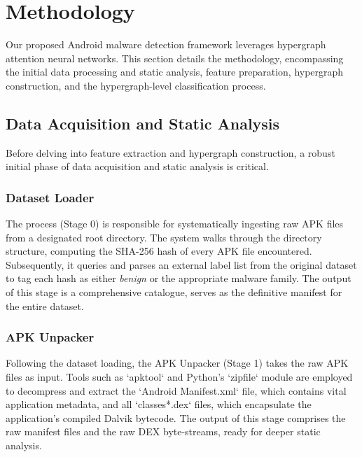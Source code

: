 \documentclass[runningheads]{llncs}
\begin{document}


\section{Methodology}
Our proposed Android malware detection framework leverages hypergraph attention neural networks. This section details the methodology, encompassing the initial data processing and static analysis, feature preparation, hypergraph construction, and the hypergraph-level classification process.



\subsection{Data Acquisition and Static Analysis}
Before delving into feature extraction and hypergraph construction, a robust initial phase of data acquisition and static analysis is critical.

\subsubsection{Dataset Loader}
The process (Stage 0) is responsible for systematically ingesting raw APK files from a designated root directory. The system walks through the directory structure, computing the SHA-256 hash of every APK file encountered. Subsequently, it queries and parses an external label list from the original dataset to tag each hash as either \textit{benign} or the appropriate malware family. The output of this stage is a comprehensive catalogue, serves as the definitive manifest for the entire dataset.

\subsubsection{APK Unpacker}
Following the dataset loading, the APK Unpacker (Stage 1) takes the raw APK files as input. Tools such as `apktool` and Python's `zipfile` module are employed to decompress and extract the `Android Manifest.xml` file, which contains vital application metadata, and all `classes*.dex` files, which encapsulate the application's compiled Dalvik bytecode. The output of this stage comprises the raw manifest files and the raw DEX byte-streams, ready for deeper static analysis.
\end{document}

